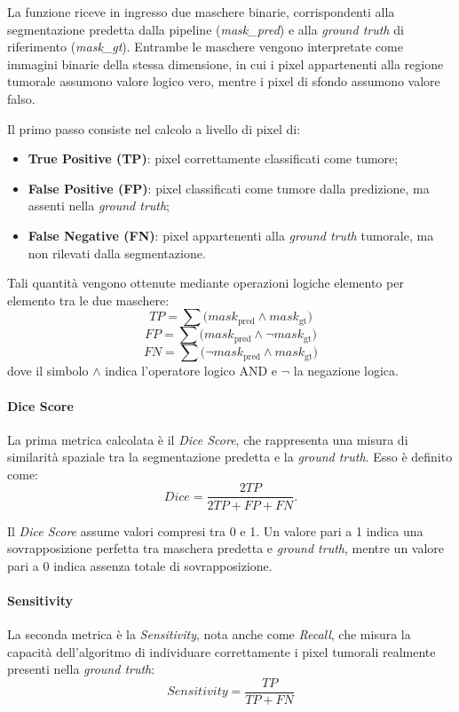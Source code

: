 La funzione riceve in ingresso due maschere binarie, corrispondenti alla segmentazione predetta dalla pipeline (\textit{mask\_pred}) e alla \textit{ground truth} di riferimento (\textit{mask\_gt}). Entrambe le maschere vengono interpretate come immagini binarie della stessa dimensione, in cui i pixel appartenenti alla regione tumorale assumono valore logico vero, mentre i pixel di sfondo assumono valore falso.

Il primo passo consiste nel calcolo a livello di pixel di:
\begin{itemize}
    \item \textbf{True Positive (TP)}: pixel correttamente classificati come tumore;
    \item \textbf{False Positive (FP)}: pixel classificati come tumore dalla predizione, ma assenti nella \textit{ground truth};
    \item \textbf{False Negative (FN)}: pixel appartenenti alla \textit{ground truth} tumorale, ma non rilevati dalla segmentazione.
\end{itemize}

Tali quantità vengono ottenute mediante operazioni logiche elemento per elemento tra le due maschere:
\[
TP = \sum \big(mask_{\text{pred}} \land mask_{\text{gt}}\big)
\]
\[
FP = \sum \big(mask_{\text{pred}} \land \neg mask_{\text{gt}}\big)
\]
\[
FN = \sum \big(\neg mask_{\text{pred}} \land mask_{\text{gt}}\big)
\]
dove il simbolo $\land$ indica l’operatore logico AND e $\neg$ la negazione logica.

\paragraph{Dice Score}
La prima metrica calcolata è il \textit{Dice Score}, che rappresenta una misura di similarità spaziale tra la segmentazione predetta e la \textit{ground truth}. Esso è definito come:
\[
Dice = \frac{2TP}{2TP + FP + FN}.
\]

Il \textit{Dice Score} assume valori compresi tra 0 e 1. Un valore pari a 1 indica una sovrapposizione perfetta tra maschera predetta e \textit{ground truth}, mentre un valore pari a 0 indica assenza totale di sovrapposizione.

\paragraph{Sensitivity}
La seconda metrica è la \textit{Sensitivity}, nota anche come \textit{Recall}, che misura la capacità dell’algoritmo di individuare correttamente i pixel tumorali realmente presenti nella \textit{ground truth}:
\[
Sensitivity = \frac{TP}{TP + FN}
\]


